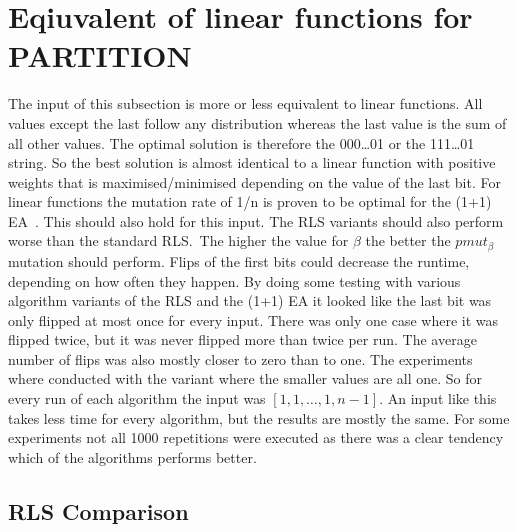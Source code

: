 \section{Eqiuvalent of linear functions for PARTITION}
The input of this subsection is more or less equivalent to linear functions. All values except the last follow any distribution whereas the last value is the sum of all other values. The optimal solution is therefore the 000\dots01 or
the 111\dots01 string. So the best solution is almost identical to a linear function with positive weights that is maximised/minimised depending on the value of the last bit.\newline
For linear functions the mutation rate of 1/n is proven to be optimal for the (1+1) EA~\cite{witt2013tight}.
This should also hold for this input.
The RLS variants should also perform worse than the standard RLS.\
The higher the value for $\beta$ the better the $pmut_\beta$ mutation should perform.
Flips of the first bits could decrease the runtime, depending on how often they happen.
By doing some testing with various algorithm variants of the RLS and the (1+1) EA it looked like the last bit was only flipped at most once for every input.
There was only one case where it was flipped twice, but it was never flipped more than twice per run.
The average number of flips was also mostly closer to zero than to one.\newline
The experiments where conducted with the variant where the smaller values are all one.
So for every run of each algorithm the input was $[1, 1, \dots, 1, n-1]$.
An input like this takes less time for every algorithm, but the results are mostly the same.
For some experiments not all 1000 repetitions were executed as there was a clear tendency which of the algorithms performs better.
\subsection{RLS Comparison}




